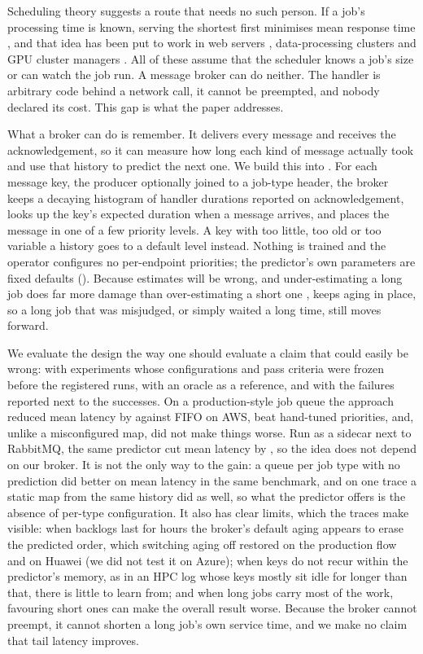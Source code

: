 Scheduling theory suggests a route that needs no such person. If a job's processing time is known, serving the shortest first minimises mean response time \citep{schrage1968}, and that idea has been put to work in web servers \citep{harchol2003}, data-processing clusters \citep{pastorelli2013} and
GPU cluster managers \citep{gu2019tiresias}. All of these assume that the scheduler knows a job's size or can watch the job run. A message broker can do neither. The handler is arbitrary code behind a network call, it cannot be preempted, and nobody declared its cost. This gap is what the paper addresses.

What a broker can do is remember. It delivers every message and receives the acknowledgement, so it can measure how long each kind of message actually took and use that history to predict the next one. We build this into \sys{}. For each message key, the producer optionally joined to a job-type header, the broker keeps a decaying histogram of
handler durations reported on acknowledgement, looks up the key's expected duration when a message arrives, and places the message in one of a few priority levels. A key with too little, too old or too variable a history goes to a default level instead. Nothing is trained and the operator configures no per-endpoint priorities; the predictor's own parameters are fixed defaults (). Because estimates will be wrong, and under-estimating a long job does far more damage
than over-estimating a short one \citep{dellamico2014}, \sys{} keeps aging in place, so a long job that was misjudged, or simply waited a long time, still moves forward.

We evaluate the design the way one should evaluate a claim that could easily be wrong: with experiments whose configurations and pass criteria were frozen before the registered runs, with an oracle as a reference, and with the failures reported next to the successes. On a production-style job queue the approach reduced mean latency by \EOneMeanVsFifoAbs{} against FIFO on AWS, beat hand-tuned priorities, and, unlike a
misconfigured map, did not make things worse. Run as a sidecar next to RabbitMQ, the same predictor cut mean latency by \EThreeSidecarAbs{}, so the idea does not depend on our broker. It is not the only way to the gain: a queue per job type with no prediction did better on mean latency in the same benchmark, and on one trace a static map from the same history did as well, so what the predictor offers is the absence of per-type configuration. It also has clear limits, which the traces make visible: when backlogs last for hours the broker's default aging appears to erase the predicted order, which switching aging off restored on the production flow and on Huawei (we did not test it on Azure); when keys do not recur within the predictor's memory, as in an HPC log whose keys mostly sit idle for longer than that, there is little to learn from; and when long jobs
carry most of the work, favouring short ones can make the overall result worse. Because the broker cannot preempt, it cannot shorten a long job's own service time, and we make no claim that tail latency improves.

